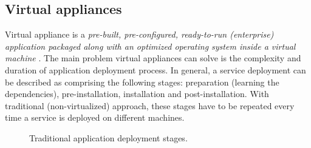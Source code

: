 \documentclass[11pt]{book}
\begin{document}



      \subsection{Virtual appliances}
      \label{sub:}



        Virtual appliance is a \textit{pre-built, pre-configured, ready-to-run (enterprise) application packaged along
        with an optimized operating system inside a virtual machine} \cite{changhua}. The main problem virtual
        appliances can solve is the complexity and duration of application deployment process.  In general, a service
        deployment can be described as comprising the following stages: preparation (learning the dependencies),
        pre-installation, installation and post-installation. With traditional (non-virtualized) approach, these stages
        have to be repeated every time a service is deployed on different machines.

        \begin{figure}[H]
          \begin{center}
          \end{center}

          \caption{Traditional application deployment stages.}
        \end{figure}
\end{document}
